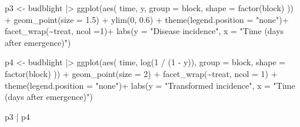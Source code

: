 \documentclass[
  letterpaper,
  DIV=11,
  numbers=noendperiod]{scrreprt}
\newenvironment{Shaded}{\begin{snugshade}}{\end{snugshade}}
\newcommand{\AttributeTok}[1]{\textcolor[rgb]{0.40,0.45,0.13}{#1}}
\newcommand{\DecValTok}[1]{\textcolor[rgb]{0.68,0.00,0.00}{#1}}
\newcommand{\FloatTok}[1]{\textcolor[rgb]{0.68,0.00,0.00}{#1}}
\newcommand{\FunctionTok}[1]{\textcolor[rgb]{0.28,0.35,0.67}{#1}}
\newcommand{\NormalTok}[1]{\textcolor[rgb]{0.00,0.23,0.31}{#1}}
\newcommand{\OtherTok}[1]{\textcolor[rgb]{0.00,0.23,0.31}{#1}}
\newcommand{\SpecialCharTok}[1]{\textcolor[rgb]{0.37,0.37,0.37}{#1}}
\newcommand{\StringTok}[1]{\textcolor[rgb]{0.13,0.47,0.30}{#1}}
\begin{document}
\begin{Shaded}
\begin{Highlighting}[]
\NormalTok{p3 }\OtherTok{\textless{}{-}}\NormalTok{ budblight }\SpecialCharTok{|\textgreater{}}
  \FunctionTok{ggplot}\NormalTok{(}\FunctionTok{aes}\NormalTok{(}
\NormalTok{    time, y,}
    \AttributeTok{group =}\NormalTok{ block,}
    \AttributeTok{shape =} \FunctionTok{factor}\NormalTok{(block)}
\NormalTok{  )) }\SpecialCharTok{+}
  \FunctionTok{geom\_point}\NormalTok{(}\AttributeTok{size =} \FloatTok{1.5}\NormalTok{) }\SpecialCharTok{+}
  \FunctionTok{ylim}\NormalTok{(}\DecValTok{0}\NormalTok{, }\FloatTok{0.6}\NormalTok{) }\SpecialCharTok{+}
  \FunctionTok{theme}\NormalTok{(}\AttributeTok{legend.position =} \StringTok{"none"}\NormalTok{)}\SpecialCharTok{+}
  \FunctionTok{facet\_wrap}\NormalTok{(}\SpecialCharTok{\textasciitilde{}}\NormalTok{treat, }\AttributeTok{ncol =}\DecValTok{1}\NormalTok{)}\SpecialCharTok{+}
  \FunctionTok{labs}\NormalTok{(}\AttributeTok{y =} \StringTok{"Disease incidence"}\NormalTok{,}
       \AttributeTok{x =} \StringTok{"Time (days after emergence)"}\NormalTok{)}

\NormalTok{p4 }\OtherTok{\textless{}{-}}\NormalTok{ budblight }\SpecialCharTok{|\textgreater{}}
  \FunctionTok{ggplot}\NormalTok{(}\FunctionTok{aes}\NormalTok{(}
\NormalTok{    time, }\FunctionTok{log}\NormalTok{(}\DecValTok{1} \SpecialCharTok{/}\NormalTok{ (}\DecValTok{1} \SpecialCharTok{{-}}\NormalTok{ y)),}
    \AttributeTok{group =}\NormalTok{ block,}
    \AttributeTok{shape =} \FunctionTok{factor}\NormalTok{(block)}
\NormalTok{  )) }\SpecialCharTok{+}
  \FunctionTok{geom\_point}\NormalTok{(}\AttributeTok{size =} \DecValTok{2}\NormalTok{) }\SpecialCharTok{+}
  \FunctionTok{facet\_wrap}\NormalTok{(}\SpecialCharTok{\textasciitilde{}}\NormalTok{treat, }\AttributeTok{ncol =} \DecValTok{1}\NormalTok{) }\SpecialCharTok{+}
  \FunctionTok{theme}\NormalTok{(}\AttributeTok{legend.position =} \StringTok{"none"}\NormalTok{)}\SpecialCharTok{+}
  \FunctionTok{labs}\NormalTok{(}\AttributeTok{y =} \StringTok{"Transformed incidence"}\NormalTok{, }\AttributeTok{x =} \StringTok{"Time (days after emergence)"}\NormalTok{)}

\NormalTok{p3 }\SpecialCharTok{|}\NormalTok{ p4}
\end{Highlighting}
\end{Shaded}
\end{document}
